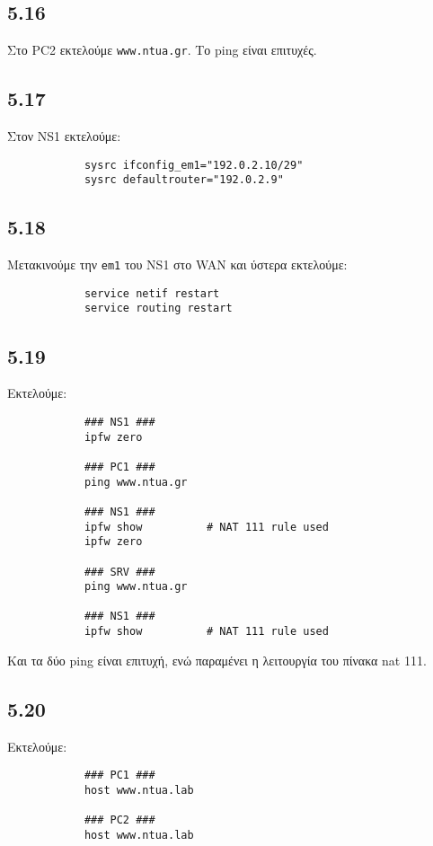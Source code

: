 \documentclass[a4paper, 12pt]{article}
\begin{document}
	\subsection*{5.16}
		Στο PC2 εκτελούμε \verb|www.ntua.gr|. Το ping είναι επιτυχές.
	
	\subsection*{5.17}
		Στον NS1 εκτελούμε:
		
		\begin{verbatim}
			sysrc ifconfig_em1="192.0.2.10/29"
			sysrc defaultrouter="192.0.2.9"
		\end{verbatim}
		
	\subsection*{5.18}
		Μετακινούμε την \verb|em1| του NS1 στο WAN και ύστερα εκτελούμε:
		
		\begin{verbatim}
			service netif restart
			service routing restart
		\end{verbatim}

	\subsection*{5.19}
		Εκτελούμε:
		
		\begin{verbatim}
			### NS1 ###
			ipfw zero
		
			### PC1 ###
			ping www.ntua.gr 
			
			### NS1 ###
			ipfw show          # NAT 111 rule used
			ipfw zero
			
			### SRV ###
			ping www.ntua.gr
			
			### NS1 ###
			ipfw show          # NAT 111 rule used
		\end{verbatim}
		
		Και τα δύο ping είναι επιτυχή, ενώ παραμένει η λειτουργία του πίνακα nat 111.

	\subsection*{5.20}
		Εκτελούμε:
		
		\begin{verbatim}
			### PC1 ###
			host www.ntua.lab
			
			### PC2 ###
			host www.ntua.lab
		\end{verbatim}
		
\end{document}
